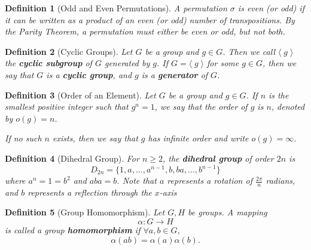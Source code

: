 \documentclass[9pt,landscape,a4paper]{article}
\newcommand{\lra}[1]{\langle \; #1 \; \rangle}
\newcommand{\hldefn}[1]{\textcolor{base16-eighties-magenta}{\textbf{#1}}}
\newcommand{\hlnotea}[1]{\textcolor{base16-eighties-green}{#1}}
\newcommand{\hlnoteb}[1]{\textcolor{base16-eighties-magenta}{\textbf{#1}}}
\theoremstyle{empty}
\newtheorem{defn}{Definition}
\begin{document}
\begin{multicols*}{5}
\begin{defn}[Odd and Even Permutations]\label{defn:odd_and_even_permutations}
  A permutation $\sigma$ is even (or odd) if it can be written as a product of an even (or odd) number of transpositions. By the \hlnotea{Parity Theorem}, a permutation must either be even or odd, but not both.
\end{defn}

\begin{defn}[Cyclic Groups]\label{defn:cyclic_groups}
  Let $G$ be a group and $g \in G$. Then we call $\lra{g}$ the \hlnoteb{cyclic subgroup} of $G$ generated by $g$. If $G = \lra{g}$ for some $g \in G$, then we say that $G$ is a \hlnoteb{cyclic group}, and $g$ is a \hldefn{generator} of $G$.
\end{defn}

\begin{defn}[Order of an Element]
\label{defn:order_of_an_element}
  Let $G$ be a group and $g \in G$. If $n$ is the smallest positive integer such that $g^n = 1$, we say that the order of $g$ is $n$, denoted by $o(g) = n$.

  \noindent If no such $n$ exists, then we say that $g$ has infinite order and write $o(g) = \infty$.
\end{defn}

\begin{defn}[Dihedral Group]
\label{defn:dihedral_group}
  For $n \geq 2$, the \hlnoteb{dihedral group} of order $2n$ is
  \begin{equation*}
    D_{2n} = \{1, a, ..., a^{n - 1}, b, ba, ..., b^{n - 1} \}
  \end{equation*}
  where $a^n = 1 = b^2$ and $aba = b$. Note that $a$ represents a rotation of $\frac{2 \pi}{n}$ radians, and $b$ represents a reflection through the $x$-axis
\end{defn}

\begin{defn}[Group Homomorphism]
\label{defn:group_homomorphism}
  Let $G, H$ be groups. A mapping
  \begin{equation*}
    \alpha : G \to H
  \end{equation*}
  is called a group \hlnoteb{homomorphism} if $\forall a, b \in G$,
  \begin{equation*}
    \alpha(ab) = \alpha(a)\alpha(b).
  \end{equation*}
\end{defn}


\end{multicols*}
\end{document}
